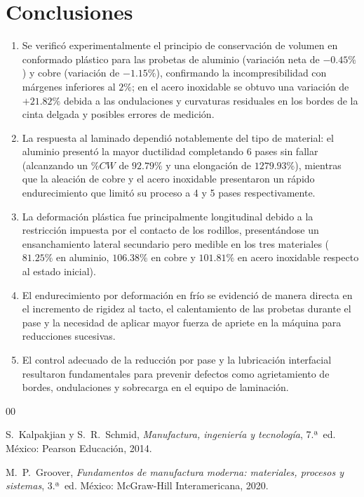 \documentclass[journal]{IEEEtran}
\begin{document}
\section{Conclusiones}
\begin{enumerate}
    \item Se verificó experimentalmente el principio de conservación de volumen en conformado plástico para las probetas de aluminio (variación neta de $-0.45\%$) y cobre (variación de $-1.15\%$), confirmando la incompresibilidad con márgenes inferiores al $2\%$; en el acero inoxidable se obtuvo una variación de $+21.82\%$ debida a las ondulaciones y curvaturas residuales en los bordes de la cinta delgada y posibles errores de medición.
    \item La respuesta al laminado dependió notablemente del tipo de material: el aluminio presentó la mayor ductilidad completando 6 pases sin fallar (alcanzando un $\%CW$ de $92.79\%$ y una elongación de $1279.93\%$), mientras que la aleación de cobre y el acero inoxidable presentaron un rápido endurecimiento que limitó su proceso a 4 y 5 pases respectivamente.
    \item La deformación plástica fue principalmente longitudinal debido a la restricción impuesta por el contacto de los rodillos, presentándose un ensanchamiento lateral secundario pero medible en los tres materiales ($81.25\%$ en aluminio, $106.38\%$ en cobre y $101.81\%$ en acero inoxidable respecto al estado inicial).
    \item El endurecimiento por deformación en frío se evidenció de manera directa en el incremento de rigidez al tacto, el calentamiento de las probetas durante el pase y la necesidad de aplicar mayor fuerza de apriete en la máquina para reducciones sucesivas.
    \item El control adecuado de la reducción por pase y la lubricación interfacial resultaron fundamentales para prevenir defectos como agrietamiento de bordes, ondulaciones y sobrecarga en el equipo de laminación.
\end{enumerate}

\begin{thebibliography}{00}

S.~Kalpakjian y S.~R.~Schmid, \emph{Manufactura, ingeniería y tecnología}, 7.ª~ed. México: Pearson Educación, 2014.

M.~P.~Groover, \emph{Fundamentos de manufactura moderna: materiales, procesos y sistemas}, 3.ª~ed. México: McGraw-Hill Interamericana, 2020.

\end{thebibliography}
\end{document}
